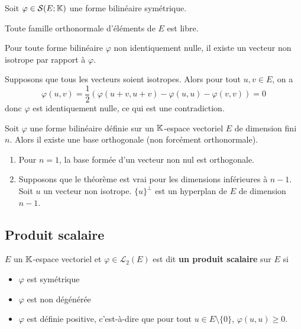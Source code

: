 \documentclass[a4paper,12pt]{article}
\begin{document}
\begin{corollaire}{}{}
    Soit $\varphi \in \mathcal{S}(E; \mathbb{K})$ une forme bilinéaire symétrique.

    Toute famille orthonormale d'éléments de $E$ est libre.
\end{corollaire}

\clearpage

\begin{lemme}{}{}
    Pour toute forme bilinéaire $\varphi$ non identiquement nulle, il existe un vecteur non isotrope par rapport à $\varphi$.
\end{lemme}

\begin{demonstration}
    Supposons que tous les vecteurs soient isotropes.
    Alors pour tout $u, v \in E$, on a
    $$
    \varphi(u, v) = \dfrac{1}{2} \left( \varphi(u + v, u + v) - \varphi(u, u) - \varphi(v, v) \right) = 0 
    $$
    donc $\varphi$ est identiquement nulle, ce qui est une contradiction.
\end{demonstration}

\begin{theoreme}{}{}
    Soit $\varphi$ une forme bilinéaire définie sur un $\mathbb{K}$-espace vectoriel $E$ de dimension fini $n$.
    Alors il existe une base orthogonale (non forcément orthonormale).
\end{theoreme}

\begin{demonstration}
    \begin{enumerate}
        \item 
        Pour $n = 1$, la base formée d'un vecteur non nul est orthogonale.
        \item
        Supposons que le théorème est vrai pour les dimensions inférieures à $n-1$.
        Soit $u$ un vecteur non isotrope.
        $\{u\}^\perp$ est un hyperplan de $E$ de dimension $n-1$.
        
    \end{enumerate}
\end{demonstration}

\subsection{Produit scalaire}

\begin{definition}{}{}
    $E$ un $\mathbb{K}$-espace vectoriel et $\varphi \in \mathcal{L}_2(E)$ est dit \textbf{un produit scalaire} sur $E$ si
    \begin{itemize}
        \item $\varphi$ est symétrique
        \item $\varphi$ est non dégénérée
        \item $\varphi$ est définie positive, c'est-à-dire que pour tout $u \in E \setminus \{0\}$, $\varphi(u, u) \geq 0$.
    \end{itemize}
\end{definition}
\end{document}
